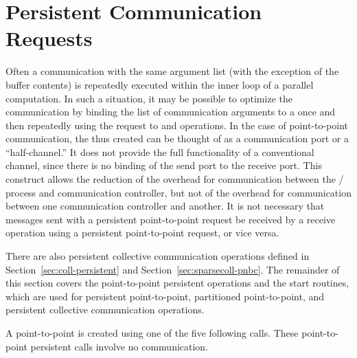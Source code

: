 \section{Persistent Communication Requests}
\label{sec:pt2pt-persistent}

Often a communication with the same argument list (with the exception of the buffer contents) is repeatedly
executed within the inner loop of a parallel computation.  In such a
situation, it may be possible to optimize the communication by
binding the list of communication arguments to a 
once and then repeatedly using
the request to  and  operations. %
In the case of point-to-point communication, the
 thus created can be thought of as a
communication port or a ``half-channel.''
It does not provide the full functionality of a conventional channel,
since there is no binding of the send port to the receive port. This
construct allows the reduction of the overhead for communication
between the \MPI/ process and communication controller, but not of the overhead for
communication between one communication controller and another.
It is not necessary that messages sent with a persistent point-to-point request be received
by a receive operation using a persistent point-to-point request, or vice versa.

There are also persistent collective communication operations defined in
Section~\ref{sec:coll-persistent} and Section~\ref{sec:sparsecoll-pnbc}.
The remainder of this section covers the point-to-point
persistent  operations and the start
routines, which are used for persistent point-to-point, partitioned point-to-point, and
persistent collective communication operations.

A point-to-point  is created using one of the
five
following calls.  These point-to-point persistent  calls involve no communication.

